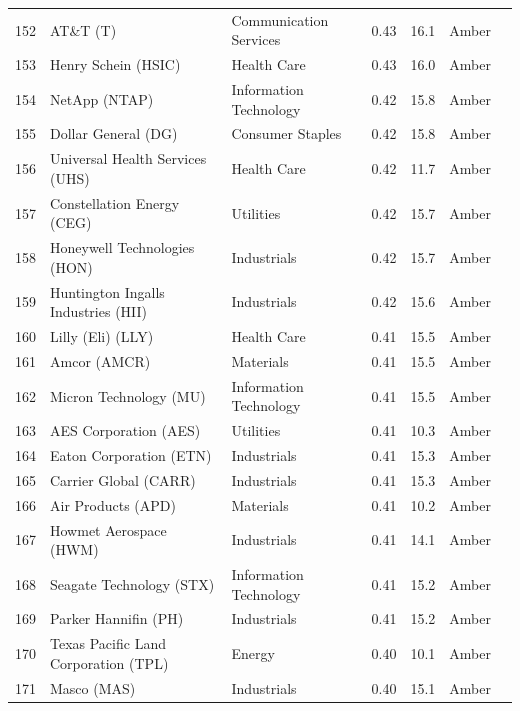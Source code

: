 \documentclass[11pt,a4paper]{article}
\begin{document}
{\begin{longtable}{r p{4.4cm} p{2.8cm} r r l l}
152 & AT\&T (T) & Communication Services & 0.43 & 16.1 & \cellcolor[HTML]{FFEB9C}Amber &  \\
153 & Henry Schein (HSIC) & Health Care & 0.43 & 16.0 & \cellcolor[HTML]{FFEB9C}Amber &  \\
154 & NetApp (NTAP) & Information Technology & 0.42 & 15.8 & \cellcolor[HTML]{FFEB9C}Amber &  \\
155 & Dollar General (DG) & Consumer Staples & 0.42 & 15.8 & \cellcolor[HTML]{FFEB9C}Amber &  \\
156 & Universal Health Services (UHS) & Health Care & 0.42 & 11.7 & \cellcolor[HTML]{FFEB9C}Amber &  \\
157 & Constellation Energy (CEG) & Utilities & 0.42 & 15.7 & \cellcolor[HTML]{FFEB9C}Amber &  \\
158 & Honeywell Technologies (HON) & Industrials & 0.42 & 15.7 & \cellcolor[HTML]{FFEB9C}Amber &  \\
159 & Huntington Ingalls Industries (HII) & Industrials & 0.42 & 15.6 & \cellcolor[HTML]{FFEB9C}Amber &  \\
160 & Lilly (Eli) (LLY) & Health Care & 0.41 & 15.5 & \cellcolor[HTML]{FFEB9C}Amber &  \\
161 & Amcor (AMCR) & Materials & 0.41 & 15.5 & \cellcolor[HTML]{FFEB9C}Amber &  \\
162 & Micron Technology (MU) & Information Technology & 0.41 & 15.5 & \cellcolor[HTML]{FFEB9C}Amber &  \\
163 & AES Corporation (AES) & Utilities & 0.41 & 10.3 & \cellcolor[HTML]{FFEB9C}Amber &  \\
164 & Eaton Corporation (ETN) & Industrials & 0.41 & 15.3 & \cellcolor[HTML]{FFEB9C}Amber &  \\
165 & Carrier Global (CARR) & Industrials & 0.41 & 15.3 & \cellcolor[HTML]{FFEB9C}Amber &  \\
166 & Air Products (APD) & Materials & 0.41 & 10.2 & \cellcolor[HTML]{FFEB9C}Amber &  \\
167 & Howmet Aerospace (HWM) & Industrials & 0.41 & 14.1 & \cellcolor[HTML]{FFEB9C}Amber &  \\
168 & Seagate Technology (STX) & Information Technology & 0.41 & 15.2 & \cellcolor[HTML]{FFEB9C}Amber &  \\
169 & Parker Hannifin (PH) & Industrials & 0.41 & 15.2 & \cellcolor[HTML]{FFEB9C}Amber &  \\
170 & Texas Pacific Land Corporation (TPL) & Energy & 0.40 & 10.1 & \cellcolor[HTML]{FFEB9C}Amber &  \\
171 & Masco (MAS) & Industrials & 0.40 & 15.1 & \cellcolor[HTML]{FFEB9C}Amber &  \\

\end{longtable}}
\end{document}

